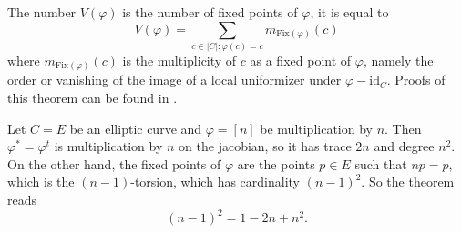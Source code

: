The number $V(\varphi)$ is the number of fixed points of $\varphi$, it is equal 
to 
$$
V(\varphi) = \sum_{c \in |C| : \varphi(c) = c} m_\text{Fix$(\varphi)$} (c)
$$
where $m_\text{Fix$(\varphi)$} (c)$ is the multiplicity of $c$ as a fixed point 
of $\varphi$, namely the order or vanishing of the image of a local uniformizer 
under $\varphi - \text{id}_C$. Proofs of this theorem can be found in 
\cite{Lang, Weil}.

\begin{example}
Let $C = E$ be an elliptic curve and $\varphi = [n]$ be multiplication by $n$. 
Then $\varphi^* = \varphi^t$ is multiplication by $n$ on the jacobian, so it 
has trace $2n$ and degree $n^2$. On the other hand, the fixed points of 
$\varphi$ are the points $p \in E$ such that $n p = p$, which is the 
$(n-1)$-torsion, which has cardinality $(n-1)^2$. So the theorem reads
$$
(n-1)^2 = 1 - 2n + n^2.
$$
\end{example}

